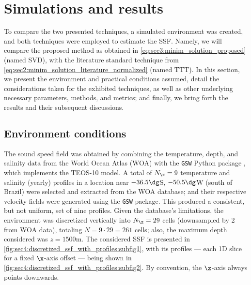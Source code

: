 \section{Simulations and results}
\label{sec:simulation_and_results}
\def\sympathlayer{optimal-import-bas-vs-svd-layer-260507-14h09m00s}
\def\sympathsurround{optimal-import-bas-vs-svd-surround-260507-14h08m50s}
\def\sympath{\sympathlayer}


To compare the two presented techniques, a simulated environment was created, and both techniques were employed to estimate the SSF. Namely, we will compare the proposed method as obtained in \cref{eq:sec3:minim_solution_proposed} (named SVD), with the literature standard technique from \cref{eq:sec2:minim_solution_literature_normalized} (named TTT). In this section, we present the environment and practical conditions assumed, detail the considerations taken for the exhibited techniques, as well as other underlying necessary parameters, methods, and metrics; and finally, we bring forth the results and their subsequent discussions.

\subsection{Environment conditions}
\label{subsec:sec4:environemnt_conditions}


    
The sound speed field was obtained by combining the temperature, depth, and salinity data from the World Ocean Atlas (WOA) \cite{garcia_world_2024} with the \texttt{GSW} Python package \cite{mcdougall_getting_2011}, which implements the TEOS-10 model. A total of $N_{\x} = 9$ temperature and salinity (yearly) profiles in a location near $-36.5\dg$S, $-50.5\dg$W (south of Brazil) were selected and extracted from the WOA database; and their respective velocity fields were generated using the \texttt{GSW} package. This produced a consistent, but not uniform, set of nine profiles. Given the database's limitations, the environment was discretized vertically into $N_{\z} = 29$ cells (downsampled by 2 from WOA data), totaling $N = 9\cdot 29 = 261$ cells; also, the maximum depth considered was $z = 1500\si{\meter}$. The considered SSF is presented in \cref{fig:sec4:discretized_ssf_with_profiles:subfig1}, with its profiles --- each 1D slice for a fixed $\x$-axis offset --- being shown in \cref{fig:sec4:discretized_ssf_with_profiles:subfig2}. By convention, the $\z$-axis always points downwards.

